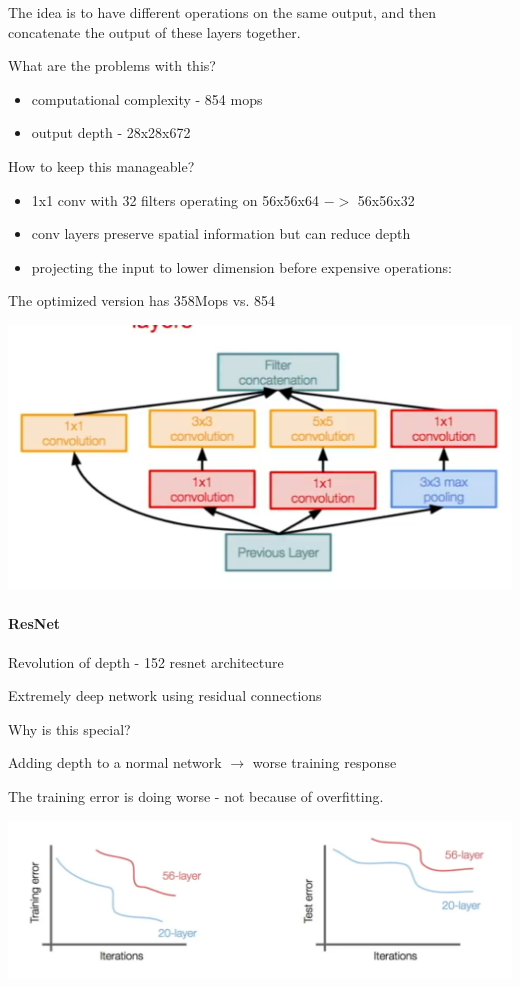 The idea is to have different operations on the same output, and then concatenate the output of these layers together.

What are the problems with this? 
\begin{itemize}
\item computational complexity - 854 mops
\item output depth - 28x28x672
\end{itemize}

How to keep this manageable?
\begin{itemize}
\item 1x1 conv with 32 filters operating on 56x56x64 $->$ 56x56x32 
\item conv layers preserve spatial information but can reduce depth
\item projecting the input to lower dimension before expensive operations:
\end{itemize}

The optimized version has 358Mops vs. 854

\includegraphics[width=0.5\columnwidth]{fei_fei_li/lecture_09/less_naive.png}

\paragraph{ResNet}

Revolution of depth - 152 resnet architecture

Extremely deep network using residual connections

Why is this special? 

Adding depth to a normal network $\rightarrow$ worse training response

The training error is doing worse - not because of overfitting.

\includegraphics[width=0.5\columnwidth]{fei_fei_li/lecture_09/deep_error.png}

